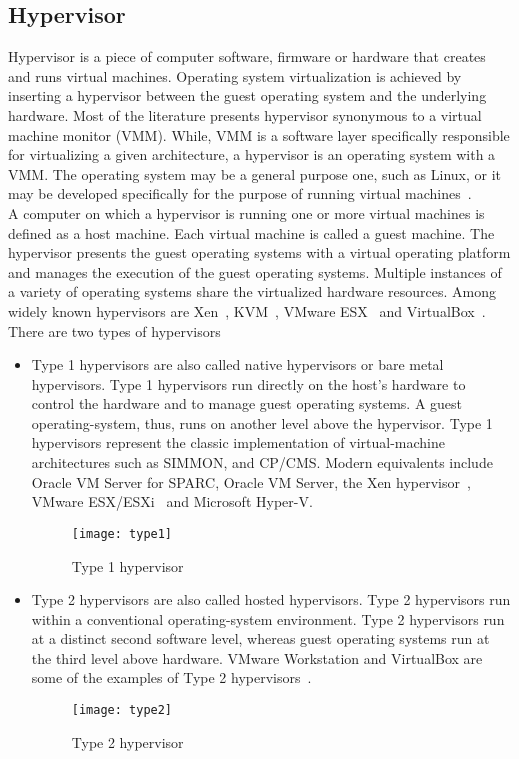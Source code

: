\subsection{Hypervisor}
Hypervisor is a piece of computer software, firmware or hardware that creates and runs virtual machines. Operating system virtualization is achieved by inserting a hypervisor between the guest operating system and the underlying hardware. Most of the literature presents hypervisor synonymous to a virtual machine monitor (VMM). While, VMM is a software layer specifically responsible for virtualizing a given architecture, a hypervisor is an operating system with a VMM. The operating system may be a general purpose one, such as Linux, or it may be developed specifically for the purpose of running virtual machines~\cite{Agesen:2010:EXV:1899928.1899930}.
\\[3mm]
A computer on which a hypervisor is running one or more virtual machines is defined as a host machine. Each virtual machine is called a guest machine. The hypervisor presents the guest operating systems with a virtual operating platform and manages the execution of the guest operating systems. Multiple instances of a variety of operating systems share the virtualized hardware resources. Among widely known hypervisors are Xen~\cite{barham2003xen, Chisnall:2007:DGX:1407351}, KVM~\cite{Habib:2008:VK:1344209.1344217, kivity2007kvm}, VMware ESX~\cite{Agesen:2010:EXV:1899928.1899930} and VirtualBox~\cite{camargos2008virtualization}.
\\[3mm]
There are two types of hypervisors~\cite{Goldberg:1973:AVM:800122.803950}
\begin{itemize}
\item Type 1 hypervisors are also called native hypervisors or bare metal hypervisors. Type 1 hypervisors run directly on the host's hardware to control the hardware and to manage guest operating systems. A guest operating-system, thus, runs on another level above the hypervisor. Type 1 hypervisors represent the classic implementation of virtual-machine architectures such as SIMMON, and CP/CMS. Modern equivalents include Oracle VM Server for SPARC, Oracle VM Server, the Xen hypervisor~\cite{barham2003xen}, VMware ESX/ESXi~\cite{Agesen:2010:EXV:1899928.1899930} and Microsoft Hyper-V.
\begin{figure}[!ht]
\centering
\texttt{[image: type1]}
\caption{Type 1 hypervisor}
\label{Type 1 hypervisor}
\end{figure}
\item Type 2 hypervisors are also called hosted hypervisors. Type 2 hypervisors run within a conventional operating-system environment. Type 2 hypervisors run at a distinct second software level, whereas guest operating systems run at the third level above hardware. VMware Workstation and VirtualBox are some of the examples of Type 2 hypervisors~\cite{Sugerman:2001:VID:647055.715774, camargos2008virtualization}.
\begin{figure}[!ht]
\centering
\texttt{[image: type2]}
\caption{Type 2 hypervisor}
\label{fig:Type 2 hypervisor}
\end{figure}
\end{itemize}

